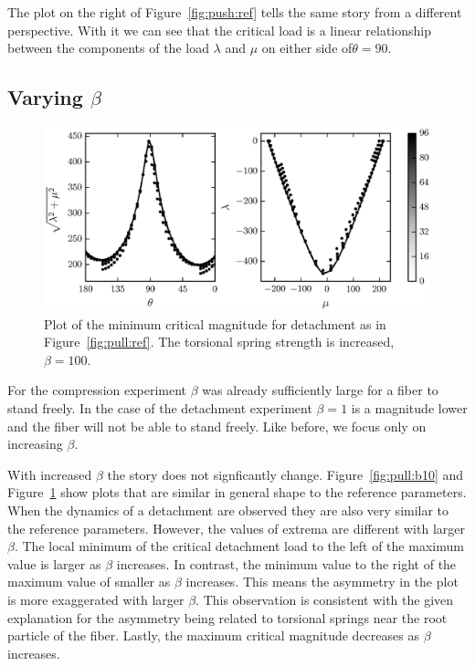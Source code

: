 The plot on the right of Figure~\ref{fig:push:ref} tells the same story from a different perspective. With it we can see that the critical load is a linear relationship between the components of the load $\lambda$ and $\mu$ on either side of$\theta=90$\textdegree.
   
\subsection{Varying $\beta$}

   \begin{figure}[t]
      \begin{center}
         \includegraphics{./fig/ch3/pull/b100/grid.eps}
      \end{center}      
      \caption{Plot of the minimum critical magnitude for detachment as in Figure~\ref{fig:pull:ref}. The torsional spring strength is increased, $\beta=100$.
      \label{fig:pull:b100}}
   \end{figure}

For the compression experiment $\beta$ was already sufficiently large for a fiber to stand freely. In the case of the detachment experiment $\beta=1$ is a magnitude lower and the fiber will not be able to stand freely. Like before, we focus only on increasing $\beta$.

With increased $\beta$ the story does not signficantly change. Figure~\ref{fig:pull:b10} and Figure~\ref{fig:pull:b100} show plots that are similar in general shape to the reference parameters. When the dynamics of a detachment are observed they are also very similar to the reference parameters. However, the values of extrema are different with larger $\beta$. The local minimum of the critical detachment load to the left of the maximum value is larger as $\beta$ increases. In contrast, the minimum value to the right of the maximum value of smaller as $\beta$ increases. This means the asymmetry in the plot is more exaggerated with larger $\beta$. This observation is consistent with the given explanation for the asymmetry being related to torsional springs near the root particle of the fiber. Lastly, the maximum critical magnitude decreases as $\beta$ increases.

